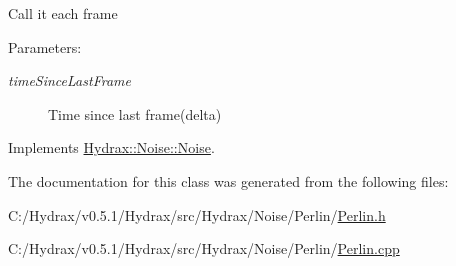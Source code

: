 Call it each frame \begin{Desc}
\item[Parameters:]
\begin{description}
\item[{\em timeSinceLastFrame}]Time since last frame(delta) \end{description}
\end{Desc}


Implements \hyperlink{class_hydrax_1_1_noise_1_1_noise_9c32c4c630f193e034c074f69ea10f57}{Hydrax::Noise::Noise}.

The documentation for this class was generated from the following files:\begin{CompactItemize}
\item 
C:/Hydrax/v0.5.1/Hydrax/src/Hydrax/Noise/Perlin/\hyperlink{_perlin_8h}{Perlin.h}\item 
C:/Hydrax/v0.5.1/Hydrax/src/Hydrax/Noise/Perlin/\hyperlink{_perlin_8cpp}{Perlin.cpp}\end{CompactItemize}
